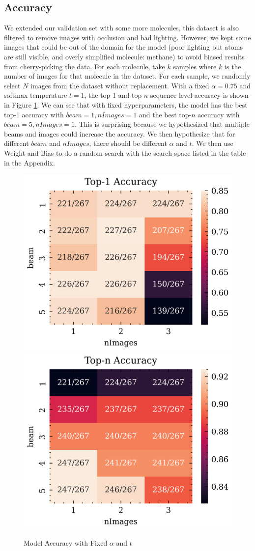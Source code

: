 \documentclass[12pt]{article}
\begin{document}
\subsection{Accuracy}
We extended our validation set with some more molecules, this dataset is also filtered to remove images with occlusion and bad lighting. However, we kept some images that could be out of the domain for the model (poor lighting but atoms are still visible, and overly simplified molecule: methane) to avoid biased results from cherry-picking the data. For each molecule, take $k$ samples where $k$ is the number of images for that molecule in the dataset. For each sample, we randomly select $N$ images from the dataset without replacement. With a fixed $\alpha=0.75$ and softmax temperature $t=1$, the top-1 and top-$n$ sequence-level accuracy is shown in Figure \ref{fig:grid}. We can see that with fixed hyperparameters, the model has the best top-1 accuracy with $beam=1, nImages=1$ and the best top-$n$ accuracy with $beam=5, nImages=1$. This is surprising because we hypothesized that multiple beams and images could increase the accuracy. We then hypothesize that for different $beam$ and $nImages$, there should be different $\alpha$ and $t$. We then use Weight and Bias \autocite{wandb} to do a random search with the search space listed in the table in the Appendix.

\begin{figure}
    \centering
    \includegraphics[width=0.45\linewidth]{top1.png}
    \includegraphics[width=0.45\linewidth]{topn.png}
    \caption{Model Accuracy with Fixed $\alpha$ and $t$}
    \label{fig:grid}
\end{figure}
\end{document}
